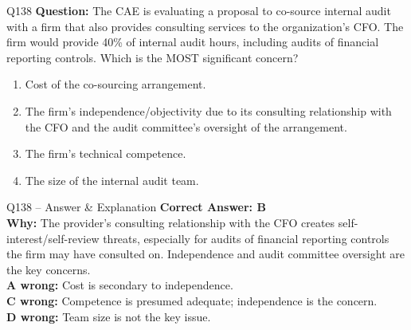 \documentclass[aspectratio=169,10pt]{beamer}
\begin{document}
	\begin{frame}[t]{Q138}
		\small
		\textbf{Question:} The CAE is evaluating a proposal to co-source internal audit with a firm that also provides consulting services to the organization's CFO. The firm would provide 40\% of internal audit hours, including audits of financial reporting controls. Which is the MOST significant concern?
		\begin{enumerate}[label=\Alph*.,itemsep=1pt,topsep=2pt]
			\item Cost of the co-sourcing arrangement.
			\item The firm's independence/objectivity due to its consulting relationship with the CFO and the audit committee's oversight of the arrangement.
			\item The firm's technical competence.
			\item The size of the internal audit team.
		\end{enumerate}
	\end{frame}
	
	\begin{frame}[t]{Q138 -- Answer \& Explanation}
		\small
		\textbf{Correct Answer: B} \\[4pt]
		\textbf{Why:} The provider's consulting relationship with the CFO creates self-interest/self-review threats, especially for audits of financial reporting controls the firm may have consulted on. Independence and audit committee oversight are the key concerns. \\[4pt]
		\textbf{A wrong:} Cost is secondary to independence. \\[2pt]
		\textbf{C wrong:} Competence is presumed adequate; independence is the concern. \\[2pt]
		\textbf{D wrong:} Team size is not the key issue.
	\end{frame}
	
\end{document}
